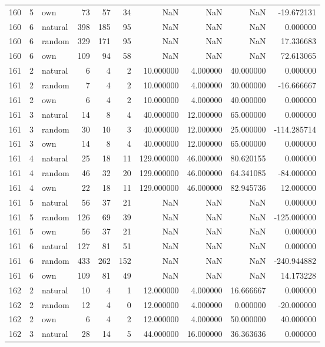 \begin{table}[htbp]
\begin{tabular}{rrlrrrrrrr}
160 & 5 & own & 73 & 57 & 34 & NaN & NaN & NaN & -19.672131 \\
160 & 6 & natural & 398 & 185 & 95 & NaN & NaN & NaN & 0.000000 \\
160 & 6 & random & 329 & 171 & 95 & NaN & NaN & NaN & 17.336683 \\
160 & 6 & own & 109 & 94 & 58 & NaN & NaN & NaN & 72.613065 \\
161 & 2 & natural & 6 & 4 & 2 & 10.000000 & 4.000000 & 40.000000 & 0.000000 \\
161 & 2 & random & 7 & 4 & 2 & 10.000000 & 4.000000 & 30.000000 & -16.666667 \\
161 & 2 & own & 6 & 4 & 2 & 10.000000 & 4.000000 & 40.000000 & 0.000000 \\
161 & 3 & natural & 14 & 8 & 4 & 40.000000 & 12.000000 & 65.000000 & 0.000000 \\
161 & 3 & random & 30 & 10 & 3 & 40.000000 & 12.000000 & 25.000000 & -114.285714 \\
161 & 3 & own & 14 & 8 & 4 & 40.000000 & 12.000000 & 65.000000 & 0.000000 \\
161 & 4 & natural & 25 & 18 & 11 & 129.000000 & 46.000000 & 80.620155 & 0.000000 \\
161 & 4 & random & 46 & 32 & 20 & 129.000000 & 46.000000 & 64.341085 & -84.000000 \\
161 & 4 & own & 22 & 18 & 11 & 129.000000 & 46.000000 & 82.945736 & 12.000000 \\
161 & 5 & natural & 56 & 37 & 21 & NaN & NaN & NaN & 0.000000 \\
161 & 5 & random & 126 & 69 & 39 & NaN & NaN & NaN & -125.000000 \\
161 & 5 & own & 56 & 37 & 21 & NaN & NaN & NaN & 0.000000 \\
161 & 6 & natural & 127 & 81 & 51 & NaN & NaN & NaN & 0.000000 \\
161 & 6 & random & 433 & 262 & 152 & NaN & NaN & NaN & -240.944882 \\
161 & 6 & own & 109 & 81 & 49 & NaN & NaN & NaN & 14.173228 \\
162 & 2 & natural & 10 & 4 & 1 & 12.000000 & 4.000000 & 16.666667 & 0.000000 \\
162 & 2 & random & 12 & 4 & 0 & 12.000000 & 4.000000 & 0.000000 & -20.000000 \\
162 & 2 & own & 6 & 4 & 2 & 12.000000 & 4.000000 & 50.000000 & 40.000000 \\
162 & 3 & natural & 28 & 14 & 5 & 44.000000 & 16.000000 & 36.363636 & 0.000000 \\

\end{tabular}
\end{table}
